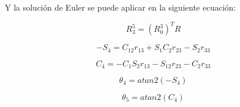 \documentclass[letter,openright,12pt,spanish]{report}
\begin{document}
Y la soluci\'on de Euler se puede aplicar en la siguiente ecuaci\'on:

\begin{displaymath}
R^5_3=(R^3_0)^TR
\end{displaymath}

\begin{displaymath}
-S_4=C_12r_13+S_1C_2r_23-S_2r_33
\end{displaymath}

\begin{displaymath}
C_4=-C_1S_2r_13-S_12r_23-C_2r_33
\end{displaymath}

\begin{displaymath}
\theta_4=atan2(-S_4)
\end{displaymath}

\begin{displaymath}
\theta_5=atan2(C_4)
\end{displaymath}
\end{document}
